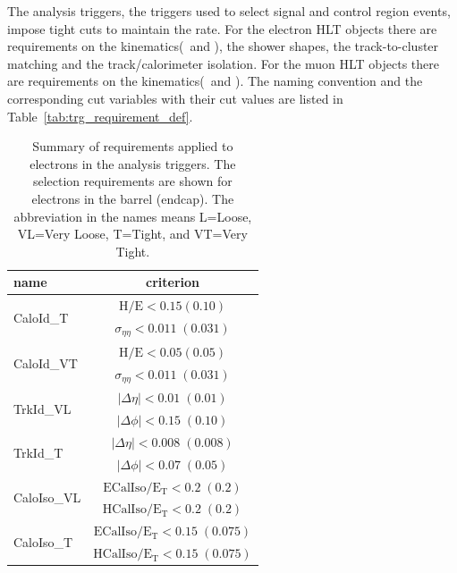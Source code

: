 The analysis triggers, the triggers used to select signal and control region events, 
impose tight cuts to maintain the rate. 
For the electron HLT objects there are requirements on
the kinematics(\pt\ and \Eta), 
the shower shapes, %
the track-to-cluster matching and 
the track/calorimeter isolation. %
For the muon HLT objects there are requirements on 
the kinematics(\pt\ and \Eta). 
The naming convention and the corresponding 
cut variables with their cut values are listed in Table~\ref{tab:trg_requirement_def}.
%
\begin{table}[htp]
 \centering
 \vspace{0.5cm}  
 \caption{Summary of requirements applied to electrons in the analysis triggers.
The selection requirements are shown for electrons in the barrel (endcap).
The abbreviation in the names means L=Loose, VL=Very Loose, T=Tight, and VT=Very Tight.}
 \vspace{0.5cm}  
 \begin{tabular}{l|c}
   \hline
   name                       &  criterion \\
   \hline \hline
   \multirow{2}{*}{CaloId\_T} & $\mathrm{H/E < 0.15 (0.10) }$ \\
                               & $\sigma_{\eta\eta}\mathrm{< 0.011\;(0.031)}$ \\
    \hline
   \multirow{2}{*}{CaloId\_VT} & $\mathrm{H/E < 0.05 (0.05) }$ \\
                               & $\sigma_{\eta\eta}\mathrm{< 0.011\;(0.031)}$  \\
    \hline \hline
    \multirow{2}{*}{TrkId\_VL} & $|\Delta\eta|\mathrm{< 0.01\; (0.01)}$ \\
                               & $|\Delta\phi|\mathrm{< 0.15\;(0.10)}$  \\
    \hline
    \multirow{2}{*}{TrkId\_T} & $|\Delta\eta|\mathrm{< 0.008\; (0.008)}$ \\
                              & $|\Delta\phi|\mathrm{< 0.07\;(0.05)}$ \\
    \hline \hline
    \multirow{2}{*}{CaloIso\_VL} & $\mathrm{ECalIso/E_T <0.2\;(0.2)}$ \\
                                 & $\mathrm{HCalIso/E_T <0.2\;(0.2)}$ \\
    \hline
    \multirow{2}{*}{CaloIso\_T} & $\mathrm{ECalIso/E_T <0.15\;(0.075)}$ \\
                                 & $\mathrm{HCalIso/E_T <0.15\;(0.075)}$ \\

\end{tabular}
\end{table}
